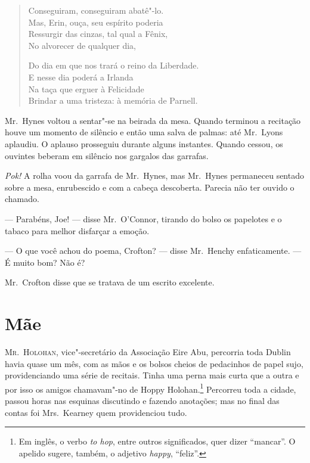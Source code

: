 \begin{verse}
Conseguiram, conseguiram abatê"-lo.\\
Mas, Erin, ouça, seu espírito poderia\\
Ressurgir das cinzas, tal qual a Fênix,\\
No alvorecer de qualquer dia,

Do dia em que nos trará o reino da Liberdade.\\
E nesse dia poderá a Irlanda\\
Na taça que erguer à Felicidade\\
Brindar a uma tristeza: à memória de Parnell.
\end{verse}

Mr.~Hynes voltou a sentar"-se na beirada da mesa.  Quando terminou a recitação
houve um momento de silêncio e então uma salva de palmas: até Mr.~Lyons
aplaudiu.  O aplauso prosseguiu durante alguns instantes.  Quando cessou, os
ouvintes beberam em silêncio nos gargalos das garrafas.

\textit{Pok!} A rolha voou da garrafa de Mr.~Hynes, mas Mr.~Hynes permaneceu
sentado sobre a mesa, enrubescido e com a cabeça descoberta.  Parecia não ter
ouvido o chamado.

--- Parabéns, Joe! --- disse Mr.~O’Connor, tirando do bolso os papelotes e o
tabaco para melhor disfarçar a emoção.

--- O que você achou do poema, Crofton? --- disse Mr.~Henchy enfaticamente.
--- É muito bom?  Não é?

Mr.~Crofton disse que se tratava de um escrito excelente.


\chapter{Mãe}

\textsc{Mr.~Holohan,} vice"-secretário da Associação Eire Abu, percorria toda
Dublin havia quase um mês, com as mãos e os bolsos cheios de pedacinhos de
papel sujo, providenciando uma série de recitais.  Tinha uma perna mais curta
que a outra e por isso os amigos chamavam"-no de Hoppy Holohan.\footnote{ Em
inglês, o verbo \textit{to hop}, entre outros significados, quer dizer ``mancar''.
O apelido sugere, também, o adjetivo \textit{happy}, “feliz”.}
Percorreu toda a cidade, passou horas nas esquinas discutindo e fazendo
anotações; mas no final das contas foi Mrs.~Kearney quem providenciou tudo.

